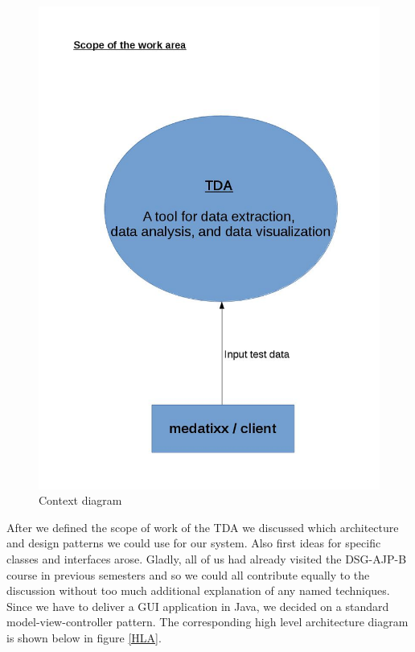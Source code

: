 \begin{figure}[h]
\begin{center}
\includegraphics[scale=0.2]{pics/Scope_of_Work_Context_Diagram_v2.jpg}
\caption{Context diagram} 
\label{Scope}
\end{center}
\end{figure}

After we defined the scope of work of the TDA we discussed which architecture and design patterns we could use for our system. Also first ideas for specific classes and interfaces arose. Gladly, all of us had already visited the DSG-AJP-B course in previous semesters and so we could all contribute equally to the discussion without too much additional explanation of any named techniques. Since we have to deliver a GUI application in Java, we decided on a standard model-view-controller pattern. The corresponding high level architecture diagram is shown below in figure \ref{HLA}. \\ 


